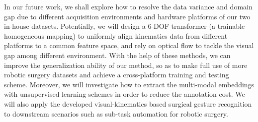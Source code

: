 \documentclass[letterpaper, 10 pt, conference]{ieeeconf}
\begin{document}
In our future work, we shall explore
how to resolve the data variance and domain gap due to different acquisition environments and hardware platforms of our two in-house datasets. Potentially, we will design a 6-DOF transformer (a trainable homogeneous mapping) to uniformly align kinematics data from different platforms to a common feature space, and rely on optical flow to tackle the visual gap among different environment. With the help of these methods, we can improve the generalization ability of our method, so as to make full use of more robotic surgery datasets and achieve a cross-platform training and testing scheme. Moreover, we will investigate how to extract the multi-modal embeddings with unsupervised learning schemes in order to reduce the annotation cost.
We will also apply the developed visual-kinematics based surgical gesture recognition to downstream scenarios such as sub-task automation for robotic surgery.





























\newpage


\end{document}
